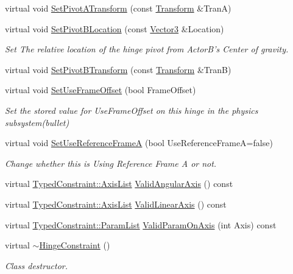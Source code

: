 \begin{DoxyCompactItemize}
virtual void \hyperlink{classphys_1_1HingeConstraint_af6fd3ac147683eecb2c98c60c58f386c}{SetPivotATransform} (const \hyperlink{classphys_1_1Transform}{Transform} \&TranA)
\item 
virtual void \hyperlink{classphys_1_1HingeConstraint_abaf055b50289aae35e7ea9f796677b18}{SetPivotBLocation} (const \hyperlink{classphys_1_1Vector3}{Vector3} \&Location)
\begin{DoxyCompactList}\small\item\em Set The relative location of the hinge pivot from ActorB's Center of gravity. \item\end{DoxyCompactList}\item 
virtual void \hyperlink{classphys_1_1HingeConstraint_a79ef3dc47fa94a7a9f98f7934e786a6b}{SetPivotBTransform} (const \hyperlink{classphys_1_1Transform}{Transform} \&TranB)
\item 
virtual void \hyperlink{classphys_1_1HingeConstraint_a3452b2c810cc0fb814f1158306e2b155}{SetUseFrameOffset} (bool FrameOffset)
\begin{DoxyCompactList}\small\item\em Set the stored value for UseFrameOffset on this hinge in the physics subsystem(bullet) \item\end{DoxyCompactList}\item 
virtual void \hyperlink{classphys_1_1HingeConstraint_ac1771e0f44124fc84b2f847fde10cb15}{SetUseReferenceFrameA} (bool UseReferenceFrameA=false)
\begin{DoxyCompactList}\small\item\em Change whether this is Using Reference Frame A or not. \item\end{DoxyCompactList}\item 
virtual \hyperlink{classphys_1_1TypedConstraint_a26261a4055e84e104c58d84eea5667c2}{TypedConstraint::AxisList} \hyperlink{classphys_1_1HingeConstraint_aceb0c3739cbde8692e4aad5695de9306}{ValidAngularAxis} () const 
\item 
virtual \hyperlink{classphys_1_1TypedConstraint_a26261a4055e84e104c58d84eea5667c2}{TypedConstraint::AxisList} \hyperlink{classphys_1_1HingeConstraint_ab3316794eec67ca2a9c1b11925e64e23}{ValidLinearAxis} () const 
\item 
virtual \hyperlink{classphys_1_1TypedConstraint_a4c2dcea3fbb764e454840329126d034e}{TypedConstraint::ParamList} \hyperlink{classphys_1_1HingeConstraint_a7fd949b157deabe3b955fd618134b1de}{ValidParamOnAxis} (int Axis) const 
\item 
virtual \hyperlink{classphys_1_1HingeConstraint_a242cdfc8ab59d608bfbd9290119d81d9}{$\sim$HingeConstraint} ()
\begin{DoxyCompactList}\small\item\em Class destructor. \item\end{DoxyCompactList}\end{DoxyCompactItemize}
